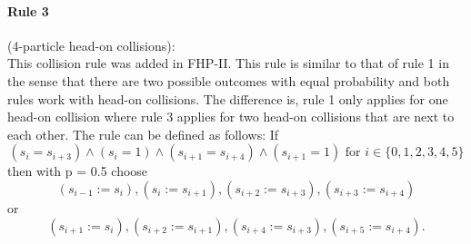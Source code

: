 \documentclass[a4paper,12pt]{article}
\begin{document}
\paragraph{Rule 3}(4-particle head-on collisions):\\
This collision rule was added in FHP-II. This rule is similar to that of rule 1 in the sense that there are two possible outcomes with equal probability and both rules work with head-on collisions. The difference is, rule 1 only applies for one head-on collision where rule 3 applies for two head-on collisions that are next to each other. The rule can be defined as follows: If \[(s_{i} = s_{i + 3})\wedge(s_{i} = 1)\wedge(s_{i + 1} = s_{i + 4})\wedge(s_{i + 1} = 1) \mbox{ for } i \in \{0, 1, 2, 3, 4, 5\}\] then with p = 0.5 choose 
\[ (s_{i - 1} := s_{i}), (s_{i } := s_{i + 1}),(s_{i + 2} := s_{i + 3}), (s_{i + 3} := s_{i + 4})\]
or
\[ (s_{i + 1} := s_{i}), (s_{i + 2} := s_{i + 1}),(s_{i + 4} := s_{i + 3}), (s_{i + 5} := s_{i + 4}).\]
\end{document}
